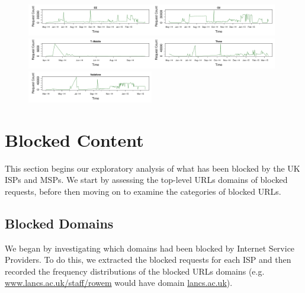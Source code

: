 \documentclass{bmcart}
\begin{document}
\begin{figure}[h!]
\caption{}
\includegraphics[width=0.49\textwidth]{imgs/EE-ts-requests.pdf}\includegraphics[width=0.49\textwidth]{imgs/O2-ts-requests.pdf}
\includegraphics[width=0.49\textwidth]{imgs/T-Mobile-ts-requests.pdf}\includegraphics[width=0.49\textwidth]{imgs/Three-ts-requests.pdf}
\includegraphics[width=0.49\textwidth]{imgs/Vodafone-ts-requests.pdf}
\label{fig:mobile-requests}
\end{figure}



\section*{Blocked Content}
This section begins our exploratory analysis of what has been blocked by the UK ISPs and MSPs.
We start by assessing the top-level URLs domains of blocked requests, before then moving on to examine the categories of blocked URLs.

\subsection*{Blocked Domains}
We began by investigating which domains had been blocked by Internet Service Providers.
To do this, we extracted the blocked requests for each ISP and then recorded the frequency distributions of the blocked URLs domains (e.g. \url{www.lancs.ac.uk/staff/rowem} would have domain \url{lancs.ac.uk}).
\end{document}
